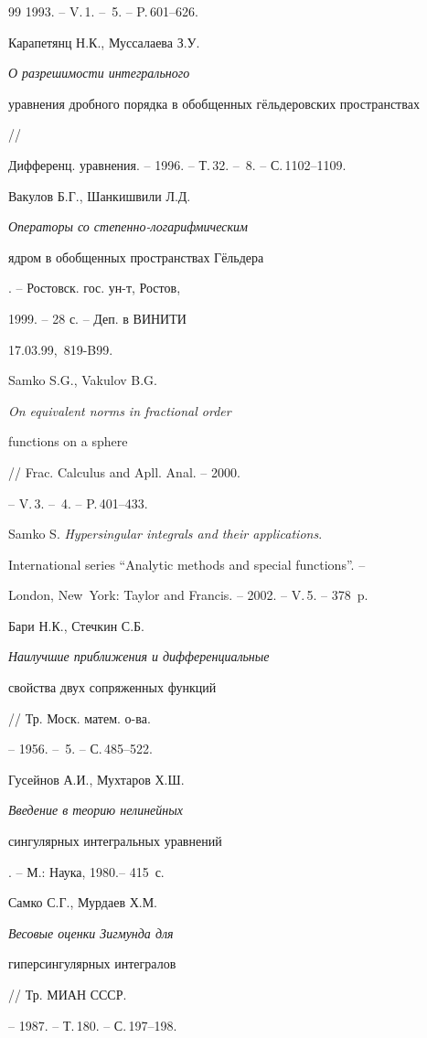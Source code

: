 \begin{thebibliography}{99}
1993. -- V.\,1. -- \No\,5. -- P.\,601--626.




Карапетянц Н.К., Муссалаева З.У. {\it О разрешимости интегрального


уравнения дробного порядка в обобщенных г\"ельдеровских пространствах} //


Дифференц. уравнения. -- 1996. -- Т.\,32. -- \No\,8. -- С.\,1102--1109.




Вакулов Б.Г., Шанкишвили Л.Д. {\it Операторы со степенно-логарифмическим 


ядром в обобщенных пространствах Г\"ельдера}. -- Ростовск. гос. ун-т, Ростов,


1999. -- 28 с. -- Деп. в ВИНИТИ


17.03.99, \No\,819-B99.




Samko S.G., Vakulov B.G. {\it On equivalent norms in fractional order


functions on a sphere} // Frac. Calculus and Apll. Anal. -- 2000.


-- V.\,3. -- \No\,4. -- P.\,401--433.




Samko S. {\it Hypersingular integrals and their applications}.


International series ``Analytic methods and special functions''. --


London, New~York: Taylor and Francis. -- 2002. -- V.\,5. -- 378~p.




Бари Н.К., Стечкин С.Б. {\it Наилучшие приближения и дифференциальные


свойства двух сопряженных функций} // Тр. Моск. матем. о-ва.


-- 1956. -- \No\,5. -- С.\,485--522.




Гусейнов А.И., Мухтаров Х.Ш. {\it Введение в теорию нелинейных


сингулярных интегральных уравнений}. -- М.: Наука, 1980.-- 415~с.




Самко С.Г., Мурдаев Х.М. {\it Весовые оценки Зигмунда для


гиперсингулярных интегралов} // Тр. МИАН СССР.


-- 1987. -- Т.\,180. -- С.\,197--198.





\end{thebibliography}
